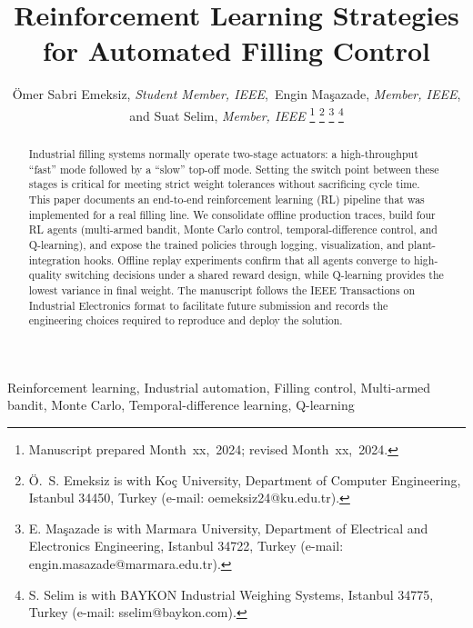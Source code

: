 \documentclass[journal]{IEEEtranTIE}
\begin{document}
\title{Reinforcement Learning Strategies for Automated Filling Control}

\author{%
\"{O}mer Sabri Emeksiz, \emph{Student Member, IEEE},\ Engin Ma\c{s}azade, \emph{Member, IEEE},\\
and Suat Selim, \emph{Member, IEEE}%
\thanks{Manuscript prepared Month~xx,~2024; revised Month~xx,~2024.}
\thanks{\"{O}.~S. Emeksiz is with Ko\c{c} University, Department of Computer Engineering, Istanbul 34450, Turkey (e-mail: oemeksiz24@ku.edu.tr).}
\thanks{E. Ma\c{s}azade is with Marmara University, Department of Electrical and Electronics Engineering, Istanbul 34722, Turkey (e-mail: engin.masazade@marmara.edu.tr).}
\thanks{S. Selim is with BAYKON Industrial Weighing Systems, Istanbul 34775, Turkey (e-mail: sselim@baykon.com).}}

\maketitle

\begin{abstract}
Industrial filling systems normally operate two-stage actuators: a high-throughput ``fast'' mode followed by a ``slow'' top-off mode. Setting the switch point between these stages is critical for meeting strict weight tolerances without sacrificing cycle time. This paper documents an end-to-end reinforcement learning (RL) pipeline that was implemented for a real filling line. We consolidate offline production traces, build four RL agents (multi-armed bandit, Monte Carlo control, temporal-difference control, and Q-learning), and expose the trained policies through logging, visualization, and plant-integration hooks. Offline replay experiments confirm that all agents converge to high-quality switching decisions under a shared reward design, while Q-learning provides the lowest variance in final weight. The manuscript follows the IEEE Transactions on Industrial Electronics format to facilitate future submission and records the engineering choices required to reproduce and deploy the solution.
\end{abstract}

\begin{IEEEkeywords}
Reinforcement learning, Industrial automation, Filling control, Multi-armed bandit, Monte Carlo, Temporal-difference learning, Q-learning
\end{IEEEkeywords}

\end{document}
